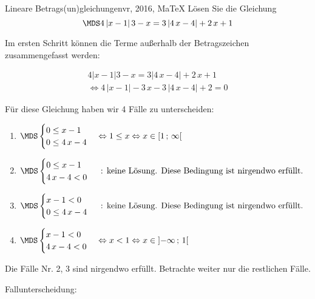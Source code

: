  \providecommand{\MoIl}[1][]{\mbox{}#1]\mathopen{}} 
 \providecommand{\MoIr}[1][]{#1[\mbox{}} 
 \providecommand{\MIntvlSep}{;} 
 \providecommand{\MElSetSep}{\, ; \, } 
 \begin{MAufgabe}{Lineare Betrags(un)gleichungen}{vr, 2016, MaTeX}
L\"osen Sie die Gleichung
$$
 \MDS 4\left| x - 1 \right|3 - x= 3 \left| 4\, x - 4 \right| +2\, x + 1
$$  

\ifLsg\MLoesung

Im ersten Schritt k\"onnen die Terme au\ss{}erhalb der Betragszeichen zusammengefasst werden:

\begin{align*} 
 4\left| x - 1 \right|3 - x= 3 \left| 4\, x - 4 \right| +2\, x + 1\\ 
\Leftrightarrow4\, \left|x - 1\right| - 3\, x - 3\, \left|4\, x - 4\right| + 2= 0 
 \end{align*}

F\"ur diese Gleichung haben wir 4 F\"alle zu unterscheiden: 
\begin{enumerate}
\item $ \MDS 
\begin{cases} 
 0 \leq x - 1\\ 
0 \leq 4\, x - 4
 \end{cases}
\Leftrightarrow 1 \leq x\Leftrightarrow x \in [ 1 \, \MIntvlSep \, \infty\MoIr $ 
\item $ \MDS 
\begin{cases} 
 0 \leq x - 1\\ 
4\, x - 4 < 0
 \end{cases}
 \mbox{ : keine L\"osung. Diese Bedingung ist nirgendwo erf\"ullt.}$ 
\item $ \MDS 
\begin{cases} 
 x - 1 < 0\\ 
0 \leq 4\, x - 4
 \end{cases}
 \mbox{ : keine L\"osung. Diese Bedingung ist nirgendwo erf\"ullt.}$ 
\item $ \MDS 
\begin{cases} 
 x - 1 < 0\\ 
4\, x - 4 < 0
 \end{cases}
\Leftrightarrow x < 1\Leftrightarrow x \in \MoIl  -\infty \, \MIntvlSep \, 1\MoIr $ 
\end{enumerate} 
Die F\"alle Nr. 2, 3 sind nirgendwo erf\"ullt. Betrachte weiter nur die restlichen F\"alle. 
 
 Fallunterscheidung: 


\end{MAufgabe}
